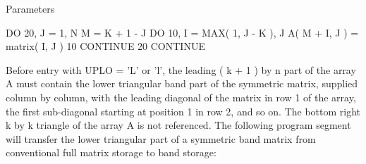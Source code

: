 \begin{DoxyParams}[1]{Parameters}
\begin{DoxyVerb}
                 DO 20, J = 1, N
                    M = K + 1 - J
                    DO 10, I = MAX( 1, J - K ), J
                       A( M + I, J ) = matrix( I, J )
              10    CONTINUE
              20 CONTINUE

           Before entry with UPLO = 'L' or 'l', the leading ( k + 1 )
           by n part of the array A must contain the lower triangular
           band part of the symmetric matrix, supplied column by
           column, with the leading diagonal of the matrix in row 1 of
           the array, the first sub-diagonal starting at position 1 in
           row 2, and so on. The bottom right k by k triangle of the
           array A is not referenced.
           The following program segment will transfer the lower
           triangular part of a symmetric band matrix from conventional
           full matrix storage to band storage:


\end{DoxyVerb}
\end{DoxyParams}
